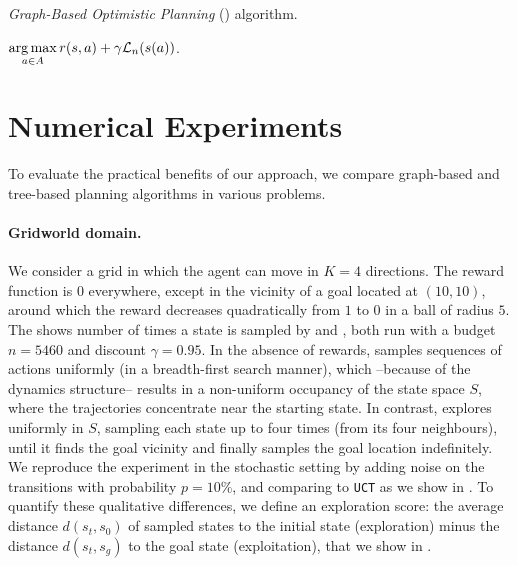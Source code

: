 \documentclass[runningheads]{llncs}
\begin{document}
\begin{algorithm}[ht]
	\caption{\emph{Graph-Based Optimistic Planning} (\GBOP) algorithm.}
	\label{alg:gbop}
	\DontPrintSemicolon
	\Return $\displaystyle\operatorname*{arg\,max}_{a\in A} r(s,a) + \gamma \mathcal{L}_n(s(a))$. 
\end{algorithm}

\section{Numerical Experiments}
\label{sec:experiments}

To evaluate the practical benefits of our approach, we compare graph-based and tree-based planning algorithms in various problems.

\paragraph{Gridworld domain.}
We consider a grid in which the agent can move in $K=4$ directions. The reward function is $0$ everywhere, except in the vicinity of a goal located at $(10, 10)$, around which the reward decreases quadratically from $1$ to $0$ in a ball of radius $5$. %
The  shows number of times a state is sampled by \OPD and \GBOPD, both run with a budget $n = 5460$ and discount $\gamma=0.95$. In the absence of rewards, \OPD samples sequences of actions uniformly (in a breadth-first search manner), which --because of the dynamics structure-- results in a non-uniform occupancy of the state space $S$, where the trajectories concentrate near the starting state. In contrast, \GBOPD explores uniformly in $S$, sampling each state up to four times (from its four  neighbours), until it finds the goal vicinity and finally samples the goal location indefinitely. We reproduce the experiment in the stochastic setting by adding noise on the transitions with probability $p=10\%$, and comparing \GBOP to \texttt{UCT} as we show in . To quantify these qualitative differences, we define an exploration score: the average distance $d(s_t, s_0)$ of sampled states to the initial state (exploration) minus the distance $d(s_t, s_g)$ to the goal state (exploitation), that we show in .
\end{document}

